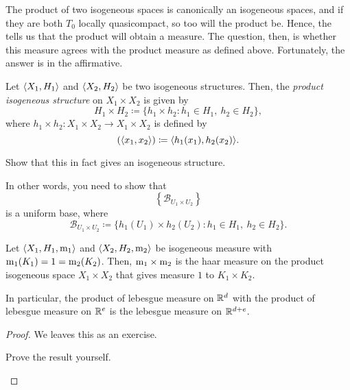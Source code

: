 The product of two isogeneous spaces is canonically an isogeneous spaces, and if they are both $T_0$ locally quasicompact, so too will the product be.  Hence, the  tells us that the product will obtain a measure.  The question, then, is whether this measure agrees with the product measure as defined above.  Fortunately, the answer is in the affirmative.
\begin{dfn}
Let $\langle X_1,H_1\rangle$ and $\langle X_2,H_2\rangle$ be two isogeneous structures.  Then, the \emph{product isogeneous structure} on $X_1\times X_2$ is given by
\begin{equation}
H_1\times H_2\coloneqq \{ h_1\times h_2:h_1\in H_1,\ h_2\in H_2\},
\end{equation}
where $h_1\times h_2:X_1\times X_2\rightarrow X_1\times X_2$ is defined by
\begin{equation}
[h_1\times h_2](\coord{x_1,x_2})\coloneqq \coord{h_1(x_1),h_2(x_2)}.
\end{equation}
\begin{exr}
Show that this in fact gives an isogeneous structure.
\begin{rmk}
In other words, you need to show that
\begin{equation}
\left\{ \mathcal{B}_{U_1\times U_2}\right\} 
\end{equation}
is a uniform base, where
\begin{equation}
\mathcal{B}_{U_1\times U_2}\coloneqq \{ h_1(U_1)\times h_2(U_2):h_1\in H_1,\ h_2\in H_2\} .
\end{equation}
\end{rmk}
\end{exr}
\end{dfn}
\begin{prp}
Let $\langle X_1,H_1,\mathrm{m} _1\rangle$ and $\langle X_2,H_2,\mathrm{m} _2\rangle$ be isogeneous measure with $\mathrm{m} _1(K_1)=1=\mathrm{m} _2(K_2)$.  Then, $\mathrm{m} _1\times \mathrm{m} _2$ is the haar measure on the product isogeneous space $X_1\times X_2$ that gives measure $1$ to $K_1\times K_2$.
\begin{rmk}
In particular, the product of lebesgue measure on $\mathbb{R} ^d$ with the product of lebesgue measure on $\mathbb{R} ^e$ is the lebesgue measure on $\mathbb{R} ^{d+e}$.
\end{rmk}
\begin{proof}
We leaves this as an exercise.
\begin{exr}
Prove the result yourself.
\end{exr}
\end{proof}
\end{prp}

